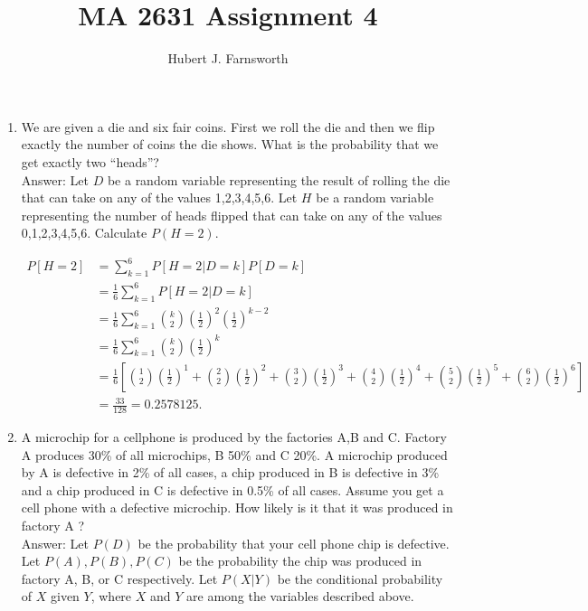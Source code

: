 \documentclass{article}
\title{MA 2631 Assignment 4}
\author{Hubert J. Farnsworth}
\begin{document}
\maketitle

\begin{enumerate}

\item

We are given a die and six fair coins.  First we roll the die and then we flip exactly the number of coins the die shows.  What is the probability that we get exactly two “heads”?\\

Answer: Let $D$ be a random variable representing the result of rolling the die that can take on any of the values 1,2,3,4,5,6. Let $H$ be a random variable representing the number of heads flipped that can take on any of the values 0,1,2,3,4,5,6. Calculate $P(H = 2)$.

\begin{align*}
P[H = 2] &= \sum_{k=1}^6 P[H = 2 | D = k] P[D = k]\\
&= \frac{1}{6}\sum_{k=1}^6 P[H = 2 | D = k] \\
&= \frac{1}{6}\sum_{k=1}^6 \binom{k}{2}\left(\frac{1}{2}\right)^{2}\left(\frac{1}{2}\right)^{k-2} \\
&= \frac{1}{6}\sum_{k=1}^6 \binom{k}{2}\left(\frac{1}{2}\right)^{k} \\ 
&= \frac{1}{6}\left[\binom{1}{2}\left(\frac{1}{2}\right)^1
+\binom{2}{2}\left(\frac{1}{2}\right)^2
+\binom{3}{2}\left(\frac{1}{2}\right)^3
+\binom{4}{2}\left(\frac{1}{2}\right)^4
+\binom{5}{2}\left(\frac{1}{2}\right)^5
+\binom{6}{2}\left(\frac{1}{2}\right)^6
\right]\\
&= \frac{33}{128} = 0.2578125.
\end{align*}

\newpage
\item

A microchip for a cellphone is produced by the factories A,B and C. Factory A produces 30\% of all microchips, B 50\% and C 20\%.  A microchip produced by A is defective in 2\% of all cases, a chip produced in B is defective in 3\% and a chip produced in C is defective in 0.5\% of all cases.  Assume you get a cell phone with a defective microchip.  How likely is it that it was produced in factory A ?\\

Answer: Let $P(D)$ be the probability that your cell phone chip is defective. Let $P(A), P(B), P(C)$ be the probability the chip was produced in factory A, B, or C respectively. Let $P(X|Y)$ be the conditional probability of $X$ given $Y$, where $X$ and $Y$ are among the variables described above. 


\end{enumerate}
\end{document}
